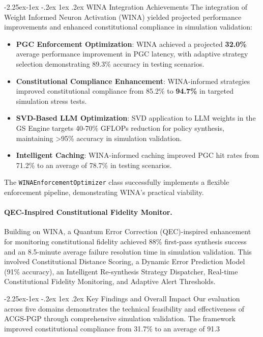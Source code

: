 \documentclass[manuscript,screen,9pt]{acmart}
\makeatletter
\renewcommand\subsection{\@startsection{subsection}{2}{\z@}%
  {-2.25ex\@plus -1ex \@minus -.2ex}%
  {1ex \@plus .2ex}%
  {\normalfont\large\bfseries}}
\makeatother
\begin{document}
\subsection{WINA Integration Achievements}
\label{subsec:wina_integration_achievements}
The integration of Weight Informed Neuron Activation (WINA) yielded projected performance improvements and enhanced constitutional compliance in simulation validation:
\begin{itemize}[leftmargin=*,itemsep=1pt,parsep=1pt]
    \item \textbf{PGC Enforcement Optimization}: WINA achieved a projected \textbf{32.0\%} average performance improvement in PGC latency, with adaptive strategy selection demonstrating 89.3\% accuracy in testing scenarios.
    \item \textbf{Constitutional Compliance Enhancement}: WINA-informed strategies improved constitutional compliance from 85.2\% to \textbf{94.7\%} in targeted simulation stress tests.
    \item \textbf{SVD-Based LLM Optimization}: SVD application to LLM weights in the GS Engine targets 40-70\% GFLOPs reduction for policy synthesis, maintaining >95\% accuracy in simulation validation.
    \item \textbf{Intelligent Caching}: WINA-informed caching improved PGC hit rates from 71.2\% to an average of 78.7\% in testing scenarios.
\end{itemize}
The \texttt{WINAEnforcementOptimizer} class successfully implements a flexible enforcement pipeline, demonstrating WINA's practical viability.

\paragraph{QEC-Inspired Constitutional Fidelity Monitor.} Building on WINA, a Quantum Error Correction (QEC)-inspired enhancement for monitoring constitutional fidelity achieved 88\% first-pass synthesis success and an 8.5-minute average failure resolution time in simulation validation. This involved Constitutional Distance Scoring, a Dynamic Error Prediction Model (91\% accuracy), an Intelligent Re-synthesis Strategy Dispatcher, Real-time Constitutional Fidelity Monitoring, and Adaptive Alert Thresholds.

\subsection{Key Findings and Overall Impact}
Our evaluation across five domains demonstrates the technical feasibility and effectiveness of ACGS-PGP through comprehensive simulation validation. The framework improved constitutional compliance from 31.7\% to an average of 91.3%
\end{document}
